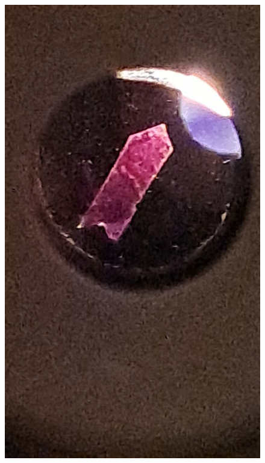 \documentclass[14pt, a4paper]{report}
\begin{document}
\begin{enumerate}
\begin{figure}[H]
\includegraphics[scale=0.2]{../images/473_6}
\end{figure}
\begin{figure}[H]
\centering

\end{figure}
\end{enumerate}
\end{document}
